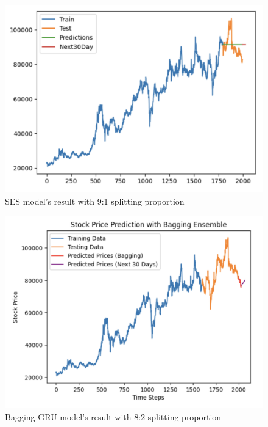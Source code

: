 \documentclass{ieeeojies}
\begin{document}
\begin{figure}[H]
  \centering
  \begin{minipage}{0.8\linewidth}
    \centering
    \includegraphics[width=\linewidth]{bibliography/ETS_VCB91.png}
    \caption{SES model's result with 9:1 splitting proportion}
    \label{fig14}
  \end{minipage}
\end{figure}
\begin{figure}[H]
  \centering
  \begin{minipage}{0.8\linewidth}
    \centering
    \includegraphics[width=\linewidth]{bibliography/baggingGRU_vcb.png}
    \caption{Bagging-GRU model's result with 8:2 splitting proportion}
    \label{bagginggru}
  \end{minipage}
\end{figure}
\end{document}

